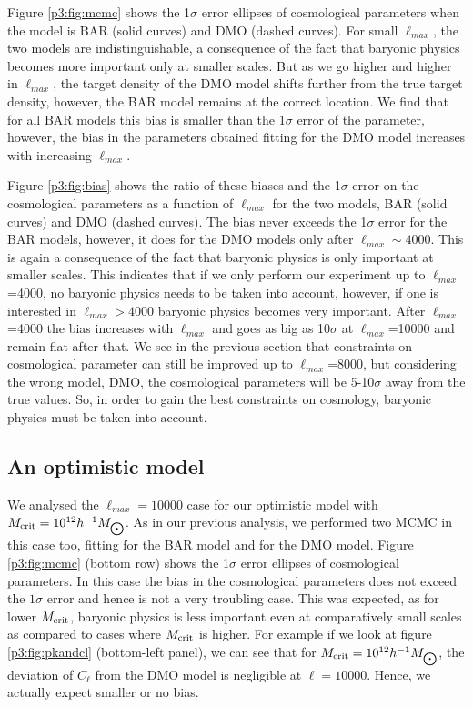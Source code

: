 \documentclass[
  11pt,
  twoside,
  openright,
  titlepage,
  headings=optiontoheadandtoc
]{scrbook}
\begin{document}
Figure \ref{p3:fig:mcmc} shows the 1$\sigma$ error ellipses of cosmological parameters when the model is BAR (solid curves) and DMO (dashed curves). For small $\ell_{max}$, the two models are indistinguishable, a consequence of the fact that baryonic physics becomes more important only at smaller scales. But as we go higher and higher in $\ell_{max}$, the target density of the DMO model shifts further from the true target density, however, the BAR model remains at the correct location.  We find that for all BAR models this bias is smaller than the 1$\sigma$ error of the parameter, however, the bias in the parameters obtained fitting for the DMO model increases with increasing $\ell_{max}$.

Figure \ref{p3:fig:bias} shows the ratio of these biases and the 1$\sigma$ error on the cosmological parameters as a function of $\ell_{max}$ for the two models, BAR (solid curves) and DMO (dashed curves). The bias never exceeds the 1$\sigma$ error for the BAR models, however, it does for the DMO models only after $\ell_{max} \sim 4000$. This is again a consequence of the fact that baryonic physics is only important at smaller scales. This indicates that if we only perform our experiment up to $\ell_{max}$=4000, no baryonic physics needs to be taken into account, however, if one is interested in $\ell_{max}>4000$ baryonic physics becomes very important. After $\ell_{max}$=4000 the bias increases with $\ell_{max}$ and goes as big as 10$\sigma$ at $\ell_{max}$=10000 and remain flat after that. We see in the previous section that constraints on cosmological parameter can still be improved up to $\ell_{max}$=8000, but considering the wrong model, DMO, the cosmological parameters will be 5-10$\sigma$ away from the true values. So, in order to gain the best constraints on cosmology, baryonic physics must be taken into account. 




\subsection{An optimistic model}
We analysed the $\ell_{max}=10000$ case for our optimistic model with $M_{\rm crit}=10^{12} h^{-1} M_{\bigodot}$. As in our previous analysis, we performed two MCMC in this case too, fitting for the BAR model and for the DMO model. Figure \ref{p3:fig:mcmc} (bottom row) shows the 1$\sigma$ error ellipses of cosmological parameters. In this case the bias in the cosmological parameters does not exceed the $1\sigma$ error and hence is not a very troubling case. This was expected, as for lower $M_{\rm crit}$, baryonic physics is less important even at comparatively small scales as compared to cases where $M_{\rm crit}$ is higher. For example if we look at figure \ref{p3:fig:pkandcl} (bottom-left panel), we can see that for $M_{\rm crit}=10^{12} h^{-1} M_{\bigodot}$, the deviation of $C_{\ell}$ from the DMO model is negligible at $\ell=10000$. Hence, we actually expect smaller or no bias. 
\end{document}
